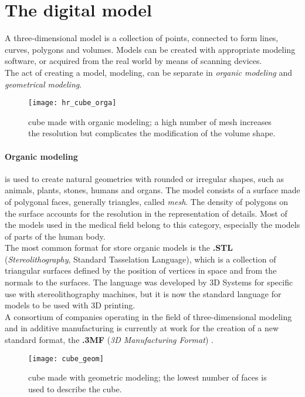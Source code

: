\section{The digital model}
A three-dimensional model is a collection of points, connected to form lines, curves, polygons and volumes. Models can be created with appropriate modeling software, or acquired from the real world by means of scanning devices. \\
The act of creating a model, modeling, can be separate in \emph{organic modeling} and \emph{geometrical modeling}.

\begin{wrapfigure}{R}{0.35\textwidth}
\texttt{[image: hr\_cube\_orga]}
    \caption{cube made with organic modeling; a high number of mesh increases the resolution but complicates the modification of the volume shape.}
    \label{fig: hr_cube_orga}
\end{wrapfigure}

\paragraph{Organic modeling} is used to create natural geometries with rounded or irregular shapes, such as animals, plants, stones, humans and organs. The model consists of a surface made of polygonal faces, generally triangles, called \emph{mesh}. The density of polygons on the surface accounts for the resolution in the representation of details. Most of the models used in the medical field belong to this category, especially the models of parts of the human body. \\
The most common format for store organic models is the \textbf{.STL} (\emph{Stereolithography}, Standard Tasselation Language), which is a collection of triangular surfaces defined by the position of vertices in space and from the normals to the surfaces. The language was developed by 3D Systems for specific use with stereolithography machines, but it is now the standard language for models to be used with 3D printing. \\ A consortium of companies operating in the field of three-dimensional modeling and in additive manufacturing is currently at work for the creation of a new standard format, the \textbf{.3MF} (\emph{3D Manufacturing Format}) \parencite{Reference143}.

\begin{wrapfigure}{R}{0.35\textwidth}
\texttt{[image: cube\_geom]}
    \caption {cube made with geometric modeling; the lowest number of faces is used to describe the cube.}
    \label {fig: cube_geom}
\end{wrapfigure}

